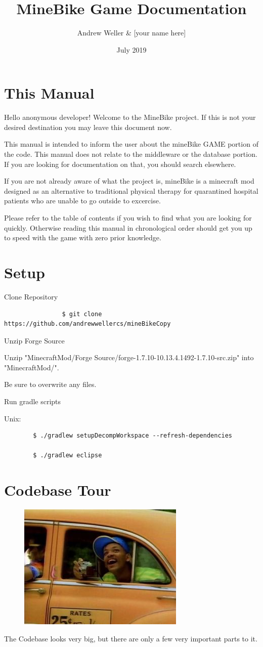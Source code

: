 \documentclass[12pt]{article}
\title{MineBike Game Documentation}
\author{Andrew Weller \& [your name here]}
\date{July 2019}
\begin{document}
\maketitle

\tableofcontents

\section{This Manual}
Hello anonymous developer! Welcome to the MineBike project. If this is not your desired destination you may leave this document now.

This manual is intended to inform the user about the mineBike GAME portion of the code. This manual does not relate to the middleware or the database portion.
If you are looking for documentation on that, you should search elsewhere.

If you are not already aware of what the project is, mineBike is a minecraft mod designed as an alternative to traditional physical therapy for quarantined hospital patients who are unable to go outside to excercise. 

Please refer to the table of contents if you wish to find what you are looking for quickly. Otherwise reading this manual in chronological order should get you up to speed with the game with zero prior knowledge.

\section {Setup}
\begin{steps}
  \item Clone Repository
		\begin{verbatim}
				$ git clone https://github.com/andrewwellercs/mineBikeCopy
		\end{verbatim}

  \item Unzip Forge Source

		Unzip "MinecraftMod/Forge Source/forge-1.7.10-10.13.4.1492-1.7.10-src.zip" into "MinecraftMod/".

		Be sure to overwrite any files.
  \item Run gradle scripts

		Unix:
	\begin{verbatim}
		$ ./gradlew setupDecompWorkspace --refresh-dependencies

		$ ./gradlew eclipse
	\end{verbatim}
\end{steps}

\section {Codebase Tour}
\begin{figure}[h]
	\includegraphics[scale=0.5]{images/will_smith_with_camera}
	\centering
\end{figure}
The Codebase looks very big, but there are only a few very important parts to it.
\end{document}
